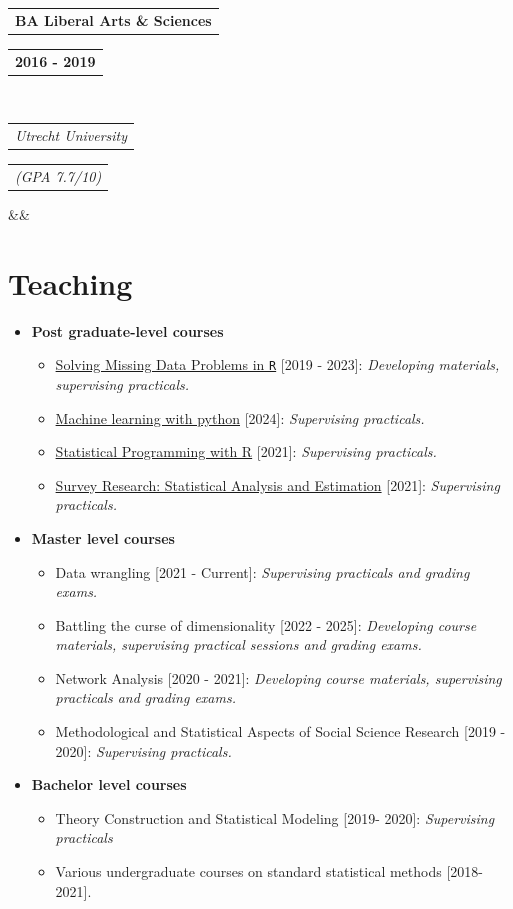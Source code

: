 \documentclass[11pt,a4paper,roman,colorlinks,linkcolor = blue]{moderncv}        %
\makeatletter
\newcommand*{\customcventry}[7][.25em]{
  \begin{tabular}{@{}l} 
    {\bfseries #4}
  \end{tabular}
  \hfill%
  \begin{tabular}{l@{}}
     {\bfseries #5}
  \end{tabular} \\
  \begin{tabular}{@{}l} 
    {\itshape #3}
  \end{tabular}
  \hfill%
  \begin{tabular}{l@{}}
     {\itshape #2}
  \end{tabular}
  \ifx&#7&%
  \else{\\%
    \begin{minipage}{\maincolumnwidth}%
      \small#7%
    \end{minipage}}\fi%
  \par\addvspace{#1}}
\makeatother
\begin{document}
\customcventry{(GPA 7.7/10)}{Utrecht University}{BA Liberal Arts \& Sciences}{2016 - 2019}{}{}{}





\section{Teaching}
\begin{itemize}
\item[$\circ$] \textbf{Post graduate-level courses}
{\begin{itemize}
  \item[--] \href{https://utrechtsummerschool.nl/courses/data-science/data-science-solving-missing-data-problems-in-r}{Solving Missing Data Problems in \texttt{R}} [2019 - 2023]: \textit{Developing materials, supervising practicals.}
  \item[--] \href{http://giachanou.com/machine-learning/}{Machine learning with python} [2024]: \textit{Supervising practicals.}
  \item[--] \href{https://utrechtsummerschool.nl/courses/data-science/data-science-statistical-programming-with-r}{Statistical Programming with R} [2021]: \textit{Supervising practicals.}
  \item[--] \href{https://utrechtsummerschool.nl/courses/data-science/survey-research-statistical-analysis-and-estimation}{Survey Research: Statistical Analysis and Estimation} [2021]: \textit{Supervising practicals.}
\end{itemize}
  }
  \item[$\circ$] \textbf{Master level courses}
  {\begin{itemize}
    \item[--] Data wrangling [2021 - Current]: \textit{Supervising practicals and grading exams.} 
    \item[--] Battling the curse of dimensionality [2022 - 2025]: \textit{Developing course materials, supervising practical sessions and grading exams.}
    \item[--] Network Analysis [2020 - 2021]: \textit{Developing course materials, supervising practicals and grading exams.}
    \item[--] Methodological and Statistical Aspects of Social Science Research [2019 - 2020]: \textit{Supervising practicals.}
   \end{itemize}
  }
  \item[$\circ$] \textbf{Bachelor level courses}
  {\begin{itemize}
    \item[--] Theory Construction and Statistical Modeling [2019- 2020]: \textit{Supervising practicals}
    \item[--] Various undergraduate courses on standard statistical methods [2018-2021].
   \end{itemize}
  }
\end{itemize}
\end{document}
